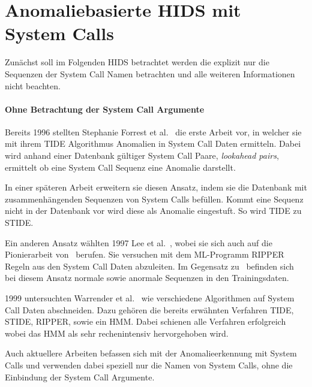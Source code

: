 \section{Anomaliebasierte HIDS mit System Calls}

    Zunächst soll im Folgenden \ac{HIDS} betrachtet werden die explizit nur die Sequenzen der System Call Namen betrachten und alle weiteren Informationen nicht beachten.

    \paragraph{Ohne Betrachtung der System Call Argumente}\label{sec:related_no_arg}
        Bereits 1996 stellten Stephanie Forrest et al.~\cite{FORREST} die erste Arbeit vor, in welcher sie mit ihrem \ac{TIDE} Algorithmus Anomalien in System Call Daten ermitteln.
        Dabei wird anhand einer Datenbank gültiger System Call Paare, \textit{lookahead pairs}, ermittelt ob eine System Call Sequenz eine Anomalie darstellt.

        In einer späteren Arbeit erweitern sie diesen Ansatz, indem sie die Datenbank mit zusammenhängenden Sequenzen von System Calls befüllen.
        Kommt eine Sequenz nicht in der Datenbank vor wird diese als Anomalie eingestuft.
        So wird \ac{TIDE} zu \ac{STIDE}.~\cite{STIDE}

        Ein anderen Ansatz wählten 1997 Lee et al.~\cite{LEE1997}, wobei sie sich auch auf die Pionierarbeit von~\cite{FORREST} berufen.
        Sie versuchen mit dem \ac{ML}-Programm RIPPER Regeln aus den System Call Daten abzuleiten.
        Im Gegensatz zu~\cite{FORREST} befinden sich bei diesem Ansatz normale sowie anormale Sequenzen in den Trainingsdaten.

        1999 untersuchten Warrender et al.~\cite{STIDE_Alternatives} wie verschiedene Algorithmen auf System Call Daten abschneiden.
        Dazu gehören die bereits erwähnten Verfahren \ac{TIDE}, \ac{STIDE}, RIPPER, sowie ein \ac{HMM}.
        Dabei schienen alle Verfahren erfolgreich wobei das \ac{HMM} als sehr rechenintensiv hervorgehoben wird.
 
        Auch aktuellere Arbeiten befassen sich mit der Anomalieerkennung mit System Calls und verwenden dabei speziell nur die Namen von System Calls, ohne die Einbindung der System Call Argumente.
    
